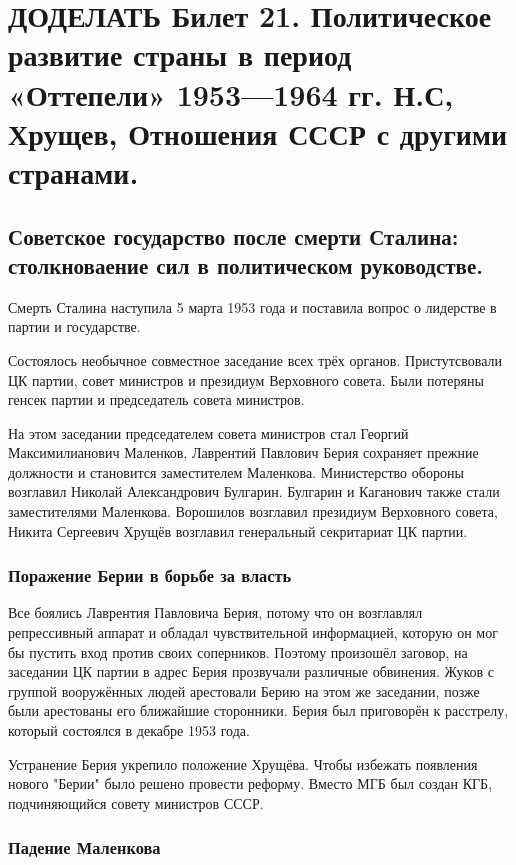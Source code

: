 \section{\textbf{ДОДЕЛАТЬ} Билет 21. Политическое развитие страны в период «Оттепели» 1953—1964 гг. Н.С, Хрущев, Отношения СССР с другими странами.}

\subsection{Советское государство после смерти Сталина: столкноваение сил в политическом руководстве.}

Смерть Сталина наступила 5 марта 1953 года и поставила вопрос о лидерстве в партии и государстве.

Состоялось необычное совместное заседание всех трёх органов. Пристутсвовали ЦК партии, совет министров и президиум Верховного совета. Были потеряны генсек партии и председатель совета министров.

На этом заседании председателем совета министров стал Георгий Максимилианович Маленков, Лаврентий Павлович Берия сохраняет прежние должности и становится заместителем Маленкова. Министерство обороны возглавил Николай Александрович Булгарин. Булгарин и Каганович также стали заместителями Маленкова. Ворошилов возглавил президиум Верховного совета, Никита Сергеевич Хрущёв возглавил генеральный секритариат ЦК партии.

\subsubsection{Поражение Берии в борьбе за власть}

Все боялись Лаврентия Павловича Берия, потому что он возглавлял репрессивный аппарат и обладал чувствительной информацией, которую он мог бы пустить вход против своих соперников. Поэтому произошёл заговор, на заседании ЦК партии в адрес Берия прозвучали различные обвинения. Жуков с группой вооружённых людей арестовали Берию на этом же заседании, позже были арестованы его ближайшие сторонники. Берия был приговорён к расстрелу, который состоялся в декабре 1953 года.

Устранение Берия укрепило положение Хрущёва. Чтобы избежать появления нового "Берии" было решено провести реформу. Вместо МГБ был создан КГБ, подчиняющийся совету министров СССР.

\subsubsection{Падение Маленкова}

